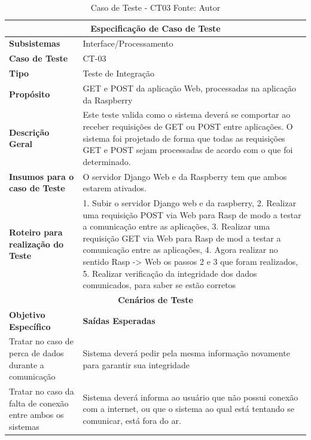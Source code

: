 \begin{table}[H]
    \begin{center}
        \begin{tabular}{|p{5cm}|p{12cm}|}
            \hline
            \multicolumn{2}{|c|}{\textbf{Especificação de Caso de Teste}} \\ \hline
                \textbf{Subsistemas}                               & Interface/Processamento \\ \hline
                \textbf{Caso de Teste}                             & CT-03 \\ \hline
                \textbf{Tipo}                                             & Teste de Integração \\ \hline
                \textbf{Propósito}                                     & GET e POST da aplicação Web, processadas na aplicação da Raspberry \\ \hline
                \textbf{Descrição Geral}                           & Este teste valida como o sistema deverá se comportar ao receber requisições de GET ou POST entre aplicações. O sistema foi projetado de forma que todas as requisições GET e POST sejam processadas de acordo com o que foi determinado. \\ \hline
                \textbf{Insumos para o caso de Teste}    & O servidor Django Web e da Raspberry tem que ambos estarem ativados. \\ \hline
                \textbf{Roteiro para realização do Teste}&  1. Subir o servidor Django web e da raspberry, 2. Realizar uma requisição POST via Web para Rasp de modo a testar a comunicação entre as aplicações, 3. Realizar uma requisição GET via Web para Rasp de mod a testar a comunicação entre as aplicações, 4. Agora realizar no sentido Rasp -> Web os passos 2 e 3 que foram realizados, 5. Realizar verificação da integridade dos dados comunicados, para saber se estão corretos \\ \hline
            \multicolumn{2}{|c|}{\textbf{Cenários de Teste}} \\ \hline
                \textbf{Objetivo Específico}                      & \textbf{Saídas Esperadas} \\ \hline
                Tratar no caso de perca de dados durante a comunicação & Sistema deverá pedir pela mesma informação novamente para garantir sua integridade \\ \hline
                Tratar no caso da falta de conexão entre ambos os sistemas & Sistema deverá informa ao usuário que não possui conexão com a internet, ou que o sistema ao qual está tentando se comunicar, está fora do ar. \\ \hline
        \end{tabular}
    \end{center}
    \caption[Caso de Teste - CT03]{Caso de Teste - CT03
    \protect Fonte: Autor}
    \label{CT-03}
\end{table}


